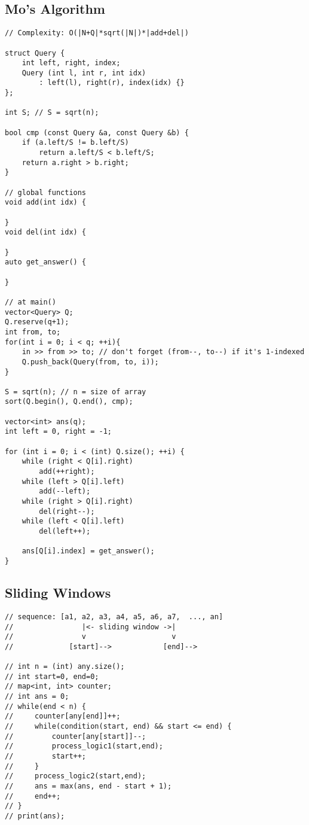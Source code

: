 \documentclass[10pt,letterpaper,twocolumn,twosided]{article}
\begin{document}
\subsection{Mo's Algorithm}
\begin{lstlisting}
// Complexity: O(|N+Q|*sqrt(|N|)*|add+del|)

struct Query {
    int left, right, index;
    Query (int l, int r, int idx)
        : left(l), right(r), index(idx) {}
};

int S; // S = sqrt(n);

bool cmp (const Query &a, const Query &b) {
    if (a.left/S != b.left/S)
        return a.left/S < b.left/S;
    return a.right > b.right;
}

// global functions
void add(int idx) {

}
void del(int idx) {

}
auto get_answer() {

}

// at main()
vector<Query> Q;
Q.reserve(q+1);
int from, to;
for(int i = 0; i < q; ++i){
    in >> from >> to; // don't forget (from--, to--) if it's 1-indexed
    Q.push_back(Query(from, to, i));
}

S = sqrt(n); // n = size of array
sort(Q.begin(), Q.end(), cmp);

vector<int> ans(q);
int left = 0, right = -1;

for (int i = 0; i < (int) Q.size(); ++i) {
    while (right < Q[i].right)
        add(++right);
    while (left > Q[i].left)
        add(--left);
    while (right > Q[i].right)
        del(right--);
    while (left < Q[i].left)
        del(left++);
    
    ans[Q[i].index] = get_answer();
}
\end{lstlisting}

\subsection{Sliding Windows}
\begin{lstlisting}
// sequence: [a1, a2, a3, a4, a5, a6, a7,  ..., an]
//                |<- sliding window ->|
//                v                    v 
//             [start]-->            [end]-->

// int n = (int) any.size();
// int start=0, end=0;
// map<int, int> counter;
// int ans = 0;
// while(end < n) {
//     counter[any[end]]++;
//     while(condition(start, end) && start <= end) {
//         counter[any[start]]--;
//         process_logic1(start,end);
//         start++;
//     }
//     process_logic2(start,end);
//     ans = max(ans, end - start + 1);
//     end++;
// }
// print(ans);
\end{lstlisting}
\end{document}
